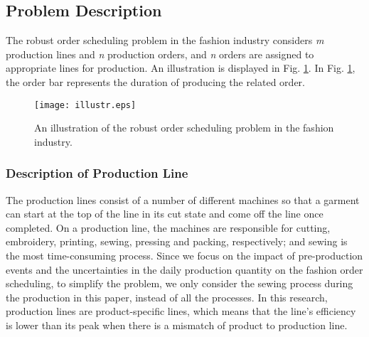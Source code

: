 \documentclass[journal]{IEEEtran}
\theoremstyle{definition}
\begin{document}
%
%
%
%
%
%
%
\renewcommand{\nomname}{\normalsize{N}\footnotesize{OMENCLATURE}}
\printnomenclature

\subsection{Problem Description} \label{odattri}
The robust order scheduling problem in the fashion industry considers \emph{m} production lines and \emph{n} production orders, and \emph{n} orders are assigned to appropriate lines for production. An illustration is displayed in Fig. \ref{illustr}. In Fig. \ref{illustr}, the order bar represents the duration of producing the related order.
\begin{figure}[!htbp]
\begin{minipage}[t]{1\linewidth}
\centering
\texttt{[image: illustr.eps]}
\caption{An illustration of the robust order scheduling problem in the fashion industry.} \label{illustr}
\end{minipage}
\end{figure}
\subsubsection{Description of Production Line}
The production lines consist of a number of different machines so that a garment can start at the top of the line in its cut state and come off the line once completed. On a production line, the machines are responsible for cutting, embroidery, printing, sewing, pressing and packing, respectively; and sewing is the most time-consuming process. Since we focus on the impact of pre-production events and the uncertainties in the daily production quantity on the fashion order scheduling, to simplify the problem, we only consider the sewing process during the production in this paper, instead of all the processes. In this research, production lines are product-specific lines, which means that the line's efficiency is lower than its peak when there is a mismatch of product to production line.
\end{document}
